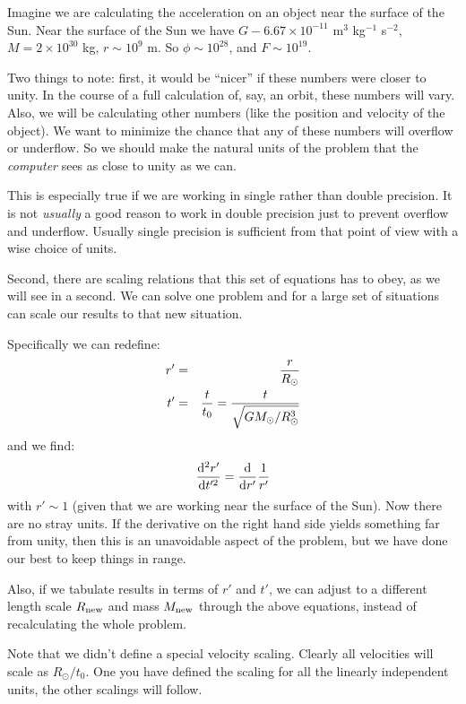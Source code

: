 Imagine we are calculating the acceleration on an object near the
surface of the Sun.  Near the surface of the Sun we have $G - 6.67
\times 10^{-11}$ m$^3$ kg$^{-1}$ s$^{-2}$, $M= 2\times 10^{30}$ kg, $r
\sim 10^9$ m. So $\phi \sim 10^{28}$, and $F\sim 10^{19}$.

Two things to note: first, it would be ``nicer'' if these numbers were
closer to unity. In the course of a full calculation of, say, an
orbit, these numbers will vary. Also, we will be calculating other
numbers (like the position and velocity of the object). We want to
minimize the chance that any of these numbers will overflow or
underflow. So we should make the natural units of the problem that the
{\it computer} sees as close to unity as we can.

This is especially true if we are working in single rather than double
precision. It is not {\it usually} a good reason to work in double
precision just to prevent overflow and underflow. Usually single
precision is sufficient from that point of view with a wise choice of
units.

Second, there are scaling relations that this set of equations has to
obey, as we will see in a second. We can solve one problem and for a
large set of situations can scale our results to that new situation.

Specifically we can redefine:
\begin{eqnarray}
r' &=& \frac{r}{R_\odot} \cr
t' &=& \frac{t}{t_0} = \frac{t}{\sqrt{GM_\odot/ R_\odot^3}}
\end{eqnarray}
and we find:
\begin{equation}
\frac{{\rm d}^2r'}{{\rm d}t'^2} = 
\frac{{\rm d}}{{\rm d}r'} \frac{1}{r'}
\end{equation}
with $r' \sim 1$ (given that we are working near the surface of the
Sun). Now there are no stray units. If the derivative on the right
hand side yields something far from unity, then this is an unavoidable
aspect of the problem, but we have done our best to keep things in
range.

Also, if we tabulate results in terms of $r'$ and $t'$, we can adjust
to a different length scale $R_{\rm new}$ and mass $M_{\rm new}$
through the above equations, instead of recalculating the whole
problem.

Note that we didn't define a special velocity scaling. Clearly all
velocities will scale as $R_\odot / t_0$. One you have defined the
scaling for all the linearly independent units, the other scalings
will follow.

